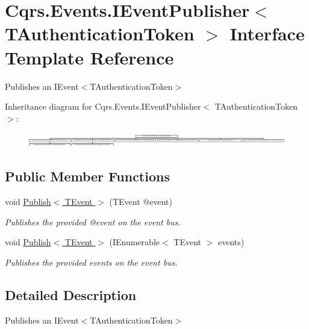 \hypertarget{interfaceCqrs_1_1Events_1_1IEventPublisher}{}\section{Cqrs.\+Events.\+I\+Event\+Publisher$<$ T\+Authentication\+Token $>$ Interface Template Reference}
\label{interfaceCqrs_1_1Events_1_1IEventPublisher}


Publishes an I\+Event$<$\+T\+Authentication\+Token$>$  


Inheritance diagram for Cqrs.\+Events.\+I\+Event\+Publisher$<$ T\+Authentication\+Token $>$\+:\begin{figure}[H]
\begin{center}
\leavevmode
\includegraphics[height=0.633484cm]{interfaceCqrs_1_1Events_1_1IEventPublisher}
\end{center}
\end{figure}
\subsection*{Public Member Functions}
\begin{DoxyCompactItemize}
\item 
void \hyperlink{interfaceCqrs_1_1Events_1_1IEventPublisher_a02f0db0bc9b3aa1c7f766f58f8422ee3_a02f0db0bc9b3aa1c7f766f58f8422ee3}{Publish$<$ T\+Event $>$} (T\+Event @event)
\begin{DoxyCompactList}\small\item\em Publishes the provided {\itshape @event}  on the event bus. \end{DoxyCompactList}\item 
void \hyperlink{interfaceCqrs_1_1Events_1_1IEventPublisher_a2cbcc3d2c24d015abef6337714ec51ff_a2cbcc3d2c24d015abef6337714ec51ff}{Publish$<$ T\+Event $>$} (I\+Enumerable$<$ T\+Event $>$ events)
\begin{DoxyCompactList}\small\item\em Publishes the provided {\itshape events}  on the event bus. \end{DoxyCompactList}\end{DoxyCompactItemize}


\subsection{Detailed Description}
Publishes an I\+Event$<$\+T\+Authentication\+Token$>$ 



